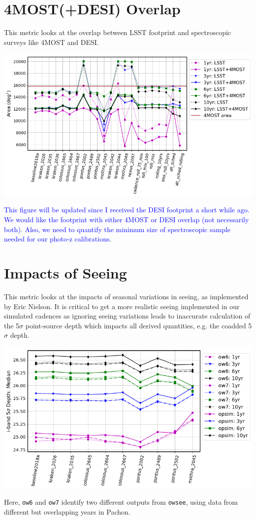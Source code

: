 \documentclass[a4paper,10pt]{article}
\newcommand{\ttt}[1]{\texttt{#1}}
\newcommand{\clB}[1]{\textcolor{blue}{#1}}
\begin{document}
\newpage
\section*{4MOST(+DESI) Overlap\label{4MOST+DESI overlap}}
This metric looks at the overlap between LSST footprint and spectroscopic surveys like 4MOST and DESI.

\begin{minipage}{\columnwidth}
\centering
 \includegraphics[width=.8\columnwidth]{lss_compare_4MOSToverlap_22dbs.png}
\end{minipage}

\clB{This figure will be updated since I received the DESI footprint a short while ago. We would like the footprint with either 4MOST or DESI overlap (not necessarily both). Also, we need to quantify the minimum size of spectroscopic sample needed for our photo-z calibrations}.

\newpage
\section*{Impacts of Seeing\label{seeing}}
This metric looks at the impacts of seasonal variations in seeing, as implemented by Eric Nielson. It is critical to get a more realistic seeing implemented in our simulated cadences as ignoring seeing variations leads to inaccurate calculation of the 5$\sigma$ point-source depth which impacts all derived quantities, e.g. the coadded 5$\sigma$ depth.

\begin{minipage}{\columnwidth}
\centering
\includegraphics[width=.75\columnwidth]{lss_compare_depth_median_10dbs_ow6_ow7_opsim.png}
\end{minipage}

Here, \ttt{ow6} and \ttt{ow7} identify two different outputs from \ttt{owsee}, using data from different but overlapping years in Pachon.
\end{document}

